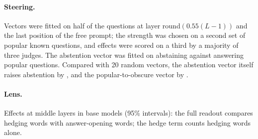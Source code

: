 \documentclass[11pt]{article}
\begin{document}
\paragraph{Steering.} Vectors were fitted on half of the questions at layer round$(0.55(L-1))$ and the last position of the free prompt; the strength was chosen on a second set of popular known questions, and effects were scored on a third by a majority of three judges. The abstention vector was fitted on \gaHi{} abstaining against \gaLo{} answering popular questions. Compared with 20 random vectors, the abstention vector itself raises abstention by \gaAbst{} \gaAbstCI, and the popular-to-obscure vector by \gaFam{} \gaFamCI.

\paragraph{Lens.} Effects at middle layers in base models (95\% intervals): the full readout compares hedging words with answer-opening words; the hedge term counts hedging words alone.

\begin{table}[h]
\centering
\scriptsize\setlength{\tabcolsep}{2pt}
\caption{Lens effects in base models. Lenses are fitted per model, so compare within a model.}
\label{tab:lens}
\end{table}
\end{document}
